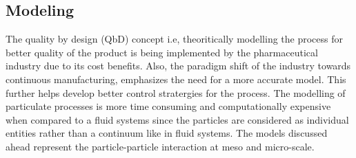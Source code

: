\documentclass[preprint,11pt,authoryear]{elsarticle}
\begin{document}
\subsection{Modeling}
\par The quality by design (QbD) concept i.e, theoritically modelling the process for better quality of the product is being implemented by the pharmaceutical industry due to its cost benefits. Also, the paradigm shift of the industry towards continuous manufacturing, emphasizes the need for a more accurate model. This further helps develop better control stratergies for the process. The modelling of particulate processes is more time consuming and computationally expensive when compared to a fluid systems since the particles are considered as individual entities rather than a continuum like in fluid systems. The models discussed ahead represent the particle-particle interaction at meso and micro-scale.	  
\end{document}
